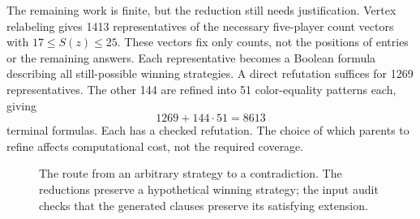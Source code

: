 The remaining work is finite, but the reduction still needs justification.
Vertex relabeling gives 1413 representatives of the necessary five-player
count vectors with $17\leq S(z)\leq25$. These vectors fix only counts,
not the positions of entries or the remaining answers. Each representative
becomes a Boolean formula describing all still-possible winning strategies.
A direct refutation suffices for 1269 representatives. The other 144 are
refined into 51 color-equality patterns each, giving
\[
1269+144\cdot51=8613
\]
terminal formulas. Each has a checked refutation. The choice of which
parents to refine affects computational cost, not the required coverage.

\begin{figure}[htbp]
\centering
{}
\caption{The route from an arbitrary strategy to a contradiction.
The reductions preserve a hypothetical winning strategy; the input audit
checks that the generated clauses preserve its satisfying extension.}
\label{fig:proof-route}
\end{figure}

